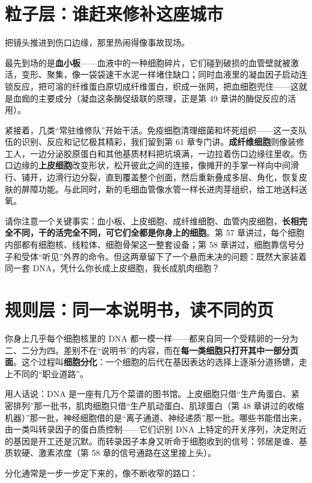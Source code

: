 \section{粒子层：谁赶来修补这座城市}

把镜头推进到伤口边缘，那里热闹得像事故现场。

最先到场的是\textbf{血小板}——血液中的一种细胞碎片，它们碰到破损的血管壁就被激活，变形、聚集，像一袋袋速干水泥一样堵住缺口；同时血液里的凝血因子启动连锁反应，把可溶的纤维蛋白原切成纤维蛋白，织成一张网，把血细胞兜住——这就是血痂的主要成分（凝血这条酶促级联的原理，正是第 49 章讲的酶促反应的活用）。

紧接着，几类“常驻维修队”开始干活。免疫细胞清理细菌和坏死组织——这一支队伍的识别、反应和记忆极其精彩，我们留到第 61 章专门讲。\textbf{成纤维细胞}则像装修工人，一边分泌胶原蛋白和其他基质材料把坑填满，一边拉着伤口边缘往里收。伤口边缘的\textbf{上皮细胞}改变形状，松开彼此之间的连接，像摊开的手掌一样向中间滑行、铺开，边滑行边分裂，直到覆盖整个创面，然后重新叠成多层、角化，恢复皮肤的屏障功能。与此同时，新的毛细血管像水管一样长进肉芽组织，给工地送料送氧。

请你注意一个关键事实：血小板、上皮细胞、成纤维细胞、血管内皮细胞，\textbf{长相完全不同，干的活完全不同，可它们全都是你身上的细胞}。第 57 章讲过，每个细胞内部都有细胞核、线粒体、细胞骨架这一整套设备；第 58 章讲过，细胞靠信号分子和受体“听见”外界的命令。但这两章留下了一个悬而未决的问题：既然大家装着同一套 DNA，凭什么你长成上皮细胞，我长成肌肉细胞？

\section{规则层：同一本说明书，读不同的页}

你身上几乎每个细胞核里的 DNA 都一模一样——都来自同一个受精卵的一分为二、二分为四。差别不在“说明书”的内容，而在\textbf{每一类细胞只打开其中一部分页面}。这个过程叫\textbf{细胞分化}：一个细胞的后代在基因表达的选择上逐渐分道扬镳，走上不同的“职业道路”。

用人话说：DNA 是一座有几万个菜谱的图书馆。上皮细胞只借“生产角蛋白、紧密排列”那一批书，肌肉细胞只借“生产肌动蛋白、肌球蛋白（第 48 章讲过的收缩机器）”那一批，神经细胞借的是“离子通道、神经递质”那一批。哪些书能借出来，由一类叫转录因子的蛋白质控制——它们识别 DNA 上特定的开关序列，决定附近的基因是开工还是沉默。而转录因子本身又听命于细胞收到的信号：邻居是谁、基质软硬、激素浓度（第 58 章的信号通路在这里接上头）。

分化通常是一步一步定下来的，像不断收窄的路口：

